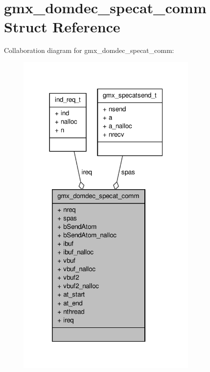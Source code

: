 \hypertarget{structgmx__domdec__specat__comm}{\section{gmx\-\_\-domdec\-\_\-specat\-\_\-comm \-Struct \-Reference}
\label{structgmx__domdec__specat__comm}
}


\-Collaboration diagram for gmx\-\_\-domdec\-\_\-specat\-\_\-comm\-:
\nopagebreak
\begin{figure}[H]
\begin{center}
\leavevmode
\includegraphics[width=252pt]{structgmx__domdec__specat__comm__coll__graph}
\end{center}
\end{figure}

